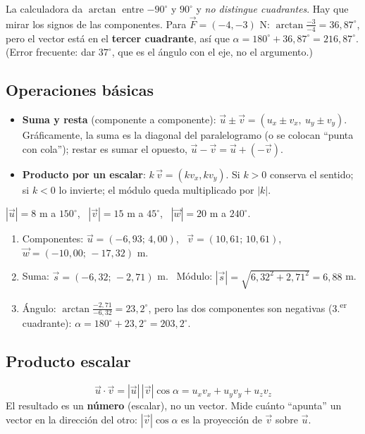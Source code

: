 \documentclass[11pt,a4paper]{article}
\begin{document}
\begin{ojo}[title={Ojo con el cuadrante}]
La calculadora da $\arctan$ entre $-90^\circ$ y $90^\circ$ y \emph{no distingue cuadrantes}. Hay que mirar los signos de las componentes. Para $\vec F=(-4,-3)$ N: $\arctan\frac{-3}{-4}=36{,}87^\circ$, pero el vector está en el \textbf{tercer cuadrante}, así que $\alpha=180^\circ+36{,}87^\circ=216{,}87^\circ$. (Error frecuente: dar $37^\circ$, que es el ángulo con el eje, no el argumento.)
\end{ojo}

\subsection{Operaciones básicas}
\begin{itemize}[itemsep=2pt]
  \item \textbf{Suma y resta} (componente a componente): $\vec u\pm\vec v=(u_x\pm v_x,\ u_y\pm v_y)$. Gráficamente, la suma es la diagonal del paralelogramo (o se colocan ``punta con cola''); restar es sumar el opuesto, $\vec u-\vec v=\vec u+(-\vec v)$.
  \item \textbf{Producto por un escalar}: $k\,\vec v=(k v_x,k v_y)$. Si $k>0$ conserva el sentido; si $k<0$ lo invierte; el módulo queda multiplicado por $|k|$.
\end{itemize}

\begin{ejemplo}[title={Ejemplo: suma de tres vectores}]
$|\vec u|=8$ m a $150^\circ$, \ $|\vec v|=15$ m a $45^\circ$, \ $|\vec w|=20$ m a $240^\circ$.
\begin{enumerate}[itemsep=1pt]
  \item Componentes: $\vec u=(-6{,}93;\,4{,}00)$, \ $\vec v=(10{,}61;\,10{,}61)$, \ $\vec w=(-10{,}00;\,-17{,}32)$ m.
  \item Suma: $\vec s=(-6{,}32;\,-2{,}71)$ m. \ Módulo: $|\vec s|=\sqrt{6{,}32^2+2{,}71^2}=6{,}88$ m.
  \item Ángulo: $\arctan\frac{-2{,}71}{-6{,}32}=23{,}2^\circ$, pero las dos componentes son negativas (3.\textsuperscript{er} cuadrante): $\alpha=180^\circ+23{,}2^\circ=203{,}2^\circ$.
\end{enumerate}
\end{ejemplo}

\subsection{Producto escalar}
\[
\boxed{\ \vec u\cdot\vec v=|\vec u|\,|\vec v|\cos\alpha=u_xv_x+u_yv_y+u_zv_z\ }
\]
El resultado es un \textbf{número} (escalar), no un vector. Mide cuánto ``apunta'' un vector en la dirección del otro: $|\vec v|\cos\alpha$ es la proyección de $\vec v$ sobre $\vec u$.
\end{document}
